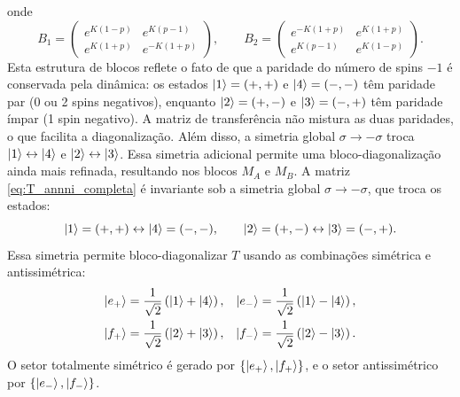\documentclass[11pt,a4paper]{article}
\begin{document}
%
onde
%
\begin{equation}
    B_1 =
    \begin{pmatrix}
        e^{K(1-p)} & e^{K(p-1)} \\
        e^{K(1+p)} & e^{-K(1+p)}
    \end{pmatrix},
    \qquad
    B_2 =
    \begin{pmatrix}
        e^{-K(1+p)} & e^{K(1+p)} \\
        e^{K(p-1)} & e^{K(1-p)}
    \end{pmatrix}.
\end{equation}
%
Esta estrutura de blocos reflete o fato de que a paridade do número de spins \(-1\) é conservada pela dinâmica: os estados \(\ket{1}=(+,+)\) e \(\ket{4}=(-,-)\) têm paridade par (0 ou 2 spins negativos), enquanto \(\ket{2}=(+,-)\) e \(\ket{3}=(-,+)\) têm paridade ímpar (1 spin negativo). A matriz de transferência não mistura as duas paridades, o que facilita a diagonalização.
%
Além disso, a simetria global \(\sigma \to -\sigma\) troca \(\ket{1} \leftrightarrow \ket{4}\) e \(\ket{2} \leftrightarrow \ket{3}\). Essa simetria adicional permite uma bloco-diagonalização ainda mais refinada, resultando nos blocos \(M_A\) e \(M_B\). A matriz \eqref{eq:T_annni_completa} é invariante sob a simetria global \(\sigma \to -\sigma\), que troca os estados:
%
\begin{equation}
    \ket{1} = (+,+) \leftrightarrow \ket{4} = (-,-), \qquad \ket{2} = (+,-) \leftrightarrow \ket{3} = (-,+).
\end{equation}
%
Essa simetria permite bloco-diagonalizar \(T\) usando as combinações simétrica e antissimétrica:
%
\begin{align}
    \ket{e_+} &= \frac{1}{\sqrt{2}} \left( \ket{1} + \ket{4} \right), &
    \ket{e_-} &= \frac{1}{\sqrt{2}} \left( \ket{1} - \ket{4} \right), \\
    \ket{f_+} &= \frac{1}{\sqrt{2}} \left( \ket{2} + \ket{3} \right), &
    \ket{f_-} &= \frac{1}{\sqrt{2}} \left( \ket{2} - \ket{3} \right).
\end{align}
%
O setor totalmente simétrico é gerado por \(\{ \ket{e_+}, \ket{f_+} \}\), e o setor antissimétrico por \(\{ \ket{e_-}, \ket{f_-} \}\).
%
\end{document}
